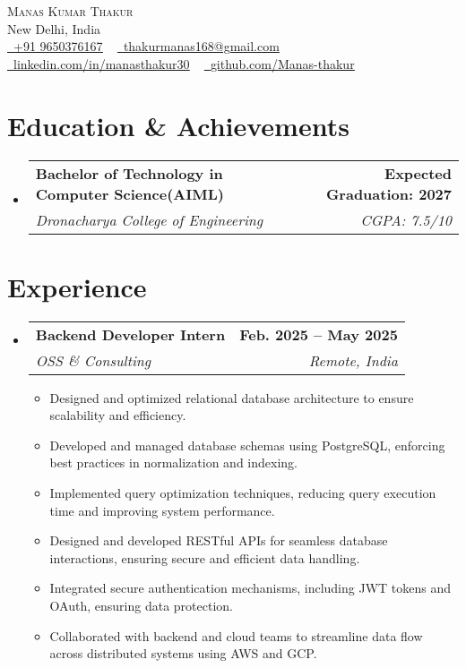 \documentclass[letterpaper,11pt]{article}
\makeatletter
\newcommand{\resumeItem}[1]{
  \item\small{
    {#1 \vspace{-2pt}}
  }
}
\newcommand{\resumeSubheading}[4]{
  \vspace{-2pt}\item
  \begin{tabular*}{1.0\textwidth}[t]{l@{\extracolsep{\fill}}r}
    \textbf{#1} & \textbf{\small #2} \\
    \textit{\small#3} & \textit{\small #4} \\
  \end{tabular*}\vspace{-7pt}
}
\newcommand{\resumeSubHeadingListStart}{\begin{itemize}[leftmargin=0.0in, label={}]}
\newcommand{\resumeSubHeadingListEnd}{\end{itemize}}
\newcommand{\resumeItemListStart}{\begin{itemize}}
\newcommand{\resumeItemListEnd}{\end{itemize}\vspace{-5pt}}
\makeatother
\begin{document}
\begin{center}
    {\Huge \scshape Manas Kumar Thakur} \\ \vspace{3pt}
    New Delhi, India \\ \vspace{3pt}
    \small 
    \href{tel:+919650376167}{\raisebox{-0.1\height}\faPhone\ \underline{+91 9650376167}} ~
    \href{mailto:thakurmanas168@gmail.com}{\raisebox{-0.2\height}\faEnvelope\ \underline{thakurmanas168@gmail.com}} ~
    \href{https://www.linkedin.com/in/manasthakur30}{\raisebox{-0.2\height}\faLinkedin\ \underline{linkedin.com/in/manasthakur30}} ~
    \href{https://github.com/Manas-thakur}{\raisebox{-0.2\height}\faGithub\ \underline{github.com/Manas-thakur}}
    \vspace{-8pt}
\end{center}

\section{Education \& Achievements}
\resumeSubHeadingListStart
  \resumeSubheading
    {Bachelor of Technology in Computer Science(AIML)}{Expected Graduation: 2027}
    {Dronacharya College of Engineering}{CGPA: 7.5/10}
\resumeSubHeadingListEnd

\section{Experience}
\resumeSubHeadingListStart
  \resumeSubheading
    {Backend Developer Intern}{Feb. 2025 -- May 2025}
    {OSS \& Consulting}{Remote, India}
    \resumeItemListStart
      \resumeItem{Designed and optimized relational database architecture to ensure scalability and efficiency.}
      \resumeItem{Developed and managed database schemas using PostgreSQL, enforcing best practices in normalization and indexing.}
      \resumeItem{Implemented query optimization techniques, reducing query execution time and improving system performance.}
      \resumeItem{Designed and developed RESTful APIs for seamless database interactions, ensuring secure and efficient data handling.}
      \resumeItem{Integrated secure authentication mechanisms, including JWT tokens and OAuth, ensuring data protection.}
      \resumeItem{Collaborated with backend and cloud teams to streamline data flow across distributed systems using AWS and GCP.}
    \resumeItemListEnd
\resumeSubHeadingListEnd
\end{document}
